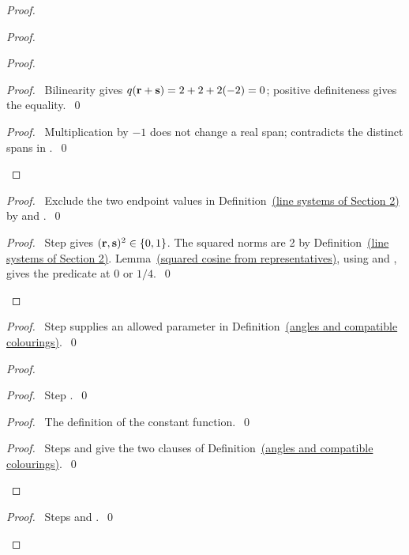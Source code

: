 \begin{mergedproofsection}
\begin{proof}
\begin{proof}
\begin{proof}
  \begin{proof}\pf\ Bilinearity gives $q({\mathbf r}+{\mathbf s})=2+2+2(-2)=0$;
  positive definiteness gives the equality.~\qed\end{proof}
  \qedstep
  \begin{proof}\pf\ Multiplication by $-1$ does not change a real span;
   contradicts the distinct spans in .~\qed\end{proof}
 \end{proof}
 \begin{proof}\pf\ Exclude the two endpoint values in
 Definition~\hyperref[def:line-system]{(line systems of Section 2)} by  and
 .~\qed\end{proof}
 \qedstep
 \begin{proof}\pf\ Step  gives
 $({\mathbf r},{\mathbf s})^2\in\{0,1\}$. The squared norms are 2 by
 Definition~\hyperref[def:line-system]{(line systems of Section 2)}. Lemma~\hyperref[lem:312-squared-cosine]{(squared cosine from representatives)},
 using  and ,
 gives the predicate at $0$ or $1/4$.~\qed\end{proof}
\end{proof}
\begin{proof}\pf\ Step  supplies an allowed
parameter in Definition~\hyperref[def:312-angles]{(angles and compatible colourings)}.~\qed\end{proof}
\begin{proof}
 \begin{proof}\pf\ Step .~\qed\end{proof}
 \begin{proof}\pf\ The definition of the constant function.~\qed\end{proof}
 \qedstep
 \begin{proof}\pf\ Steps  and
  give the two clauses of
 Definition~\hyperref[def:312-angles]{(angles and compatible colourings)}.~\qed\end{proof}
\end{proof}
\qedstep
\begin{proof}\pf\ Steps  and .~\qed\end{proof}
\end{proof}


\end{mergedproofsection}
